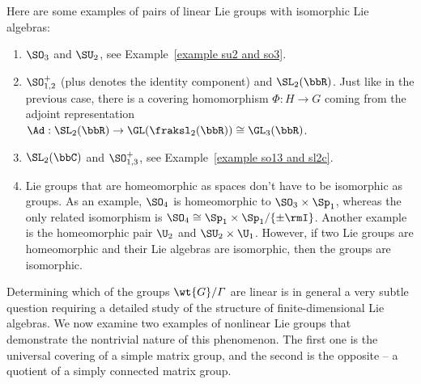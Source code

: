 \begin{example}
    Here are some examples of pairs of linear Lie groups with isomorphic Lie algebras:
    \begin{enumerate}
        \item $\SO_3$ and $\SU_2$, see Example~\ref{example su2 and so3}.
        \item $\SO^+_{1,2}$ (plus denotes the identity component) and $\SL_2(\bbR)$. Just like in the previous case, there is a covering homomorphism $\varPhi:H\to G$ coming from the adjoint representation $\Ad:\SL_2(\bbR)\to \GL(\fraksl_2(\bbR))\cong \GL_3(\bbR)$.
        \item $\SL_2(\bbC)$ and $\SO_{1,3}^+$, see Example~\ref{example so13 and sl2c}.
        \item Lie groups that are homeomorphic as spaces don't have to be isomorphic as groups. As an example, $\SO_4$ is homeomorphic to $\SO_3\times \Sp_1$, whereas the only related isomorphism is $\SO_4\cong \Sp_1\times\Sp_1\slash \{\pm \rmI\}$. Another example is the homeomorphic pair $\U_2$ and $\SU_2\times \U_1$. However, if two Lie groups are homeomorphic and their Lie algebras are isomorphic, then the groups are isomorphic.
    \end{enumerate}
\end{example}


Determining which of the groups $\wt{G}\slash \varGamma$ are linear is in general a very subtle question requiring a detailed study of the structure of finite-dimensional Lie algebras. We now examine two examples of nonlinear Lie groups that demonstrate the nontrivial nature of this phenomenon. The first one is the universal covering of a simple matrix group, and the second is the opposite -- a quotient of a simply connected matrix group.

